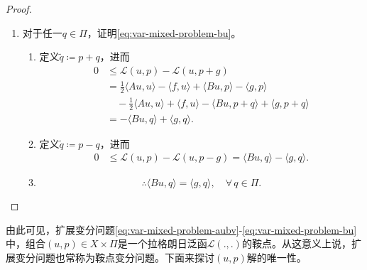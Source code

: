 \begin{proof}
\begin{enumerate}
\item 对于任一$q \in \Pi$，证明\eqref{eq:var-mixed-problem-bu}。
\begin{enumerate}
  \item 定义$\tilde{q} \coloneqq p + q$，进而
  \begin{equation*}
  \begin{split}
  0 &\le \mathcal{L}(u,p) - \mathcal{L}(u, p + g) \\  &= \frac{1}{2} \langle A u , u \rangle - \langle f, u \rangle + \langle B u, p \rangle - \langle g, p \rangle \\
  & \quad - \frac{1}{2} \langle A u , u \rangle + \langle f, u \rangle - \langle B u, p + q \rangle + \langle g, p + q \rangle \\
  & = - \langle B u, q \rangle + \langle g, q \rangle .
  \end{split}
  \end{equation*}
  \item 定义$\tilde{q} \coloneqq p - q$，进而
  \begin{equation*}
  \begin{split}
  0 &\le \mathcal{L}(u,p) - \mathcal{L}(u, p - g) = \langle B u, q \rangle - \langle g, q \rangle .
  \end{split}
  \end{equation*}
  \item
  \begin{equation}
    \therefore \langle B u , q \rangle = \langle g, q \rangle, \quad \forall \, q \in \Pi.
  \end{equation}
\end{enumerate}
\end{enumerate}
\end{proof}

由此可见，扩展变分问题\eqref{eq:var-mixed-problem-aubv}-\eqref{eq:var-mixed-problem-bu}中，组合$(u,p) \in X \times \Pi$是一个拉格朗日泛函$\mathcal{L}(.,.)$的鞍点。从这意义上说，扩展变分问题也常称为鞍点变分问题。下面来探讨$(u,p)$解的唯一性。

